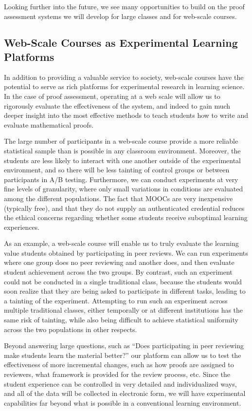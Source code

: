 \documentclass[12pt]{article}
\begin{document}
Looking further into the future, we see many opportunities to build on
the proof assessment systems we will develop for large classes and for
web-scale courses.

\subsection{Web-Scale Courses as Experimental Learning Platforms}

In addition to providing a valuable service to society, web-scale
courses have the potential to serve as rich platforms for experimental
research in learning science.  In the case of proof assessment,
operating at a web scale will allow us to rigorously evaluate the
effectiveness of the system, and indeed to gain much deeper insight
into the most effective methods to teach students how to write and
evaluate mathematical proofs.

The large number of participants in a web-scale course provide a more
reliable statistical sample than is possible in any classroom
environment.  Moreover, the students are less likely to interact with
one another outside of the experimental environment, and so there will
be less tainting of control groups or between participants in A/B
testing.  Furthermore, we can conduct experiments at very fine levels
of granularity, where only small variations in conditions are
evaluated among the different populations.  The fact that MOOCs are
very inexpensive (typically free), and that they do not supply an
authenticated credential reduces the ethical concerns regarding whether
some students receive suboptimal learning experiences.

As an example, a web-scale course will enable us to truly evaluate the
learning value students obtained by participating in peer reviews.  We
can run experiments where one group does no peer reviewing and another
does, and then evaluate student achievement across the two groups.  By
contrast, such an experiment could not be conducted in a single
traditional class, because the students would soon realize that they
are being asked to participate in different tasks, leading to a
tainting of the experiment.  Attempting to run such an experiment
across multiple traditional classes, either temporally or at different
institutions has the same risk of tainting, while also being difficult
to achieve statistical uniformity across the two populations in other
respects.

Beyond answering large questions, such as ``Does participating in peer
reviewing make students learn the material better?'' our platform can
allow us to test the effectiveness of more incremental changes, such
as how proofs are assigned to reviewers, what framework is provided
for the review process, etc.  Since the student experience can be
controlled in very detailed and individualized ways, and all of the
data will be collected in electronic form, we will have experimental
capabilities far beyond what is possible in a conventional learning
environment.
\end{document}
